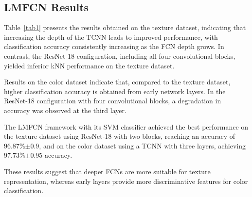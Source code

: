 \documentclass[conference]{IEEEtran}
\begin{document}
\subsection{LMFCN Results}

Table~\ref{tab1} presents the results obtained on the texture dataset, indicating that increasing the depth of the TCNN leads to improved performance, with classification accuracy consistently increasing as the FCN depth grows. In contrast, the ResNet-18 configuration, including all four convolutional blocks, yielded inferior kNN performance on the texture dataset. 

Results on the color dataset indicate that, compared to the texture dataset, higher classification accuracy is obtained from early network layers. In the ResNet-18 configuration with four convolutional blocks, a degradation in accuracy was observed at the third layer. 

The LMFCN framework with its SVM classifier achieved the best performance on the texture dataset using ResNet-18 with two blocks, reaching an accuracy of 96.87\%$\pm$0.9, and on the color dataset using a TCNN with three layers, achieving 97.73\%$\pm$0.95 accuracy.

These results suggest that deeper FCNs are more suitable for texture representation, whereas early layers provide more discriminative features for color classification.


\end{document}
